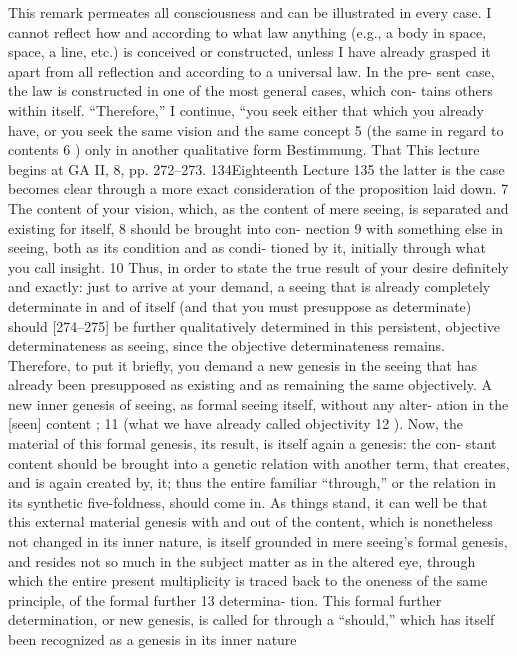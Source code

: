 This remark permeates all consciousness and can be illustrated in every
case. I cannot reflect how and according to what law anything (e.g., a body in
space, space, a line, etc.) is conceived or constructed, unless I have already
grasped it apart from all reflection and according to a universal law. In the pre-
sent case, the law is constructed in one of the most general cases, which con-
tains others within itself. “Therefore,” I continue, “you seek either that which
you already have, or you seek the same vision and the same concept 5 (the same
in regard to contents 6 ) only in another qualitative form {Bestimmung}. That
This lecture begins at GA II, 8, pp. 272–273.
134Eighteenth Lecture
135
the latter is the case becomes clear through a more exact consideration of the
proposition laid down. 7 The content of your vision, which, as the content of
mere seeing, is separated and existing for itself, 8 should be brought into con-
nection 9 with something else in seeing, both as its condition and as condi-
tioned by it, initially through what you call insight. 10 Thus, in order to state the
true result of your desire definitely and exactly: just to arrive at your demand,
a seeing that is already completely determinate in and of itself (and that you
must presuppose as determinate) should [274–275] be further qualitatively
determined in this persistent, objective determinateness as seeing, since the
objective determinateness remains. Therefore, to put it briefly, you demand a
new genesis in the seeing that has already been presupposed as existing and as
remaining the same objectively.
A new inner genesis of seeing, as formal seeing itself, without any alter-
ation in the [seen] content ; 11 (what we have already called objectivity 12 ). Now,
the material of this formal genesis, its result, is itself again a genesis: the con-
stant content should be brought into a genetic relation with another term,
that creates, and is again created by, it; thus the entire familiar “through,” or
the relation in its synthetic five-foldness, should come in. As things stand, it
can well be that this external material genesis with and out of the content,
which is nonetheless not changed in its inner nature, is itself grounded in
mere seeing’s formal genesis, and resides not so much in the subject matter
as in the altered eye, through which the entire present multiplicity is traced
back to the oneness of the same principle, of the formal further 13 determina-
tion. This formal further determination, or new genesis, is called for through
a “should,” which has itself been recognized as a genesis in its inner nature

